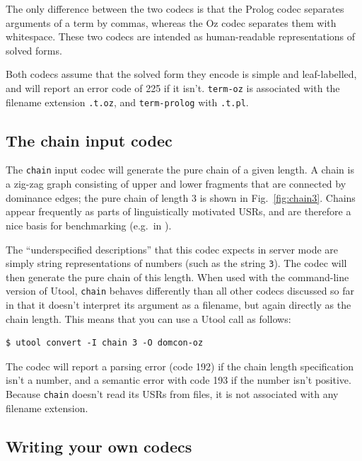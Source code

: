 The only difference between the two codecs is that the Prolog codec
separates arguments of a term by commas, whereas the Oz codec
separates them with whitespace. These two codecs are intended as
human-readable representations of solved forms.

Both codecs assume that the solved form they encode is simple and
leaf-labelled, and will report an error code of 225 if it
isn't. \verb?term-oz? is associated with the filename extension
\verb?.t.oz?, and \verb?term-prolog? with \verb?.t.pl?.





\subsection{The chain input codec}

The \verb?chain? input codec will generate the pure chain
\cite{Koller04} of a given length. A chain is a zig-zag graph
consisting of upper and lower fragments that are connected by
dominance edges; the pure chain of length 3 is shown in
Fig.~\ref{fig:chain3}. Chains appear frequently as parts of
linguistically motivated USRs, and are therefore a nice basis for
benchmarking (e.g.\ in \cite{bodirsky-weakly-normal-constraints}).

The ``underspecified descriptions'' that this codec expects in server
mode are simply string representations of numbers (such as the string
\verb?3?). The codec will then generate the pure chain of this
length. When used with the command-line version of Utool, \verb?chain?
behaves differently than all other codecs discussed so far in that it
doesn't interpret its argument as a filename, but again directly as
the chain length. This means that you can use a Utool call as follows:

\begin{verbatim}
$ utool convert -I chain 3 -O domcon-oz
\end{verbatim}

The codec will report a parsing error (code 192) if the chain length
specification isn't a number, and a semantic error with code 193 if
the number isn't positive. Because \verb?chain? doesn't read its USRs
from files, it is not associated with any filename extension.






\subsection{Writing your own codecs}

